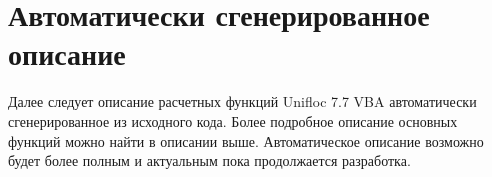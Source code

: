 \documentclass[a4paper,14pt,oneside,openany]{memoir}
\newcommand{\unf}{Unifloc 7.7 VBA }
\begin{document}
	

	
\appendix
\setlength{\midchapskip}{20pt}
\renewcommand*{\afterchapternum}{\par\nobreak\vskip \midchapskip}
\renewcommand\thechapter{\Asbuk{chapter}} %
	
	

\chapter{Автоматически сгенерированное описание}

Далее следует описание расчетных функций \unf автоматически сгенерированное из исходного кода.
Более подробное описание основных функций можно найти в описании выше. Автоматическое описание возможно будет более полным и актуальным пока продолжается разработка.


	
\end{document}
